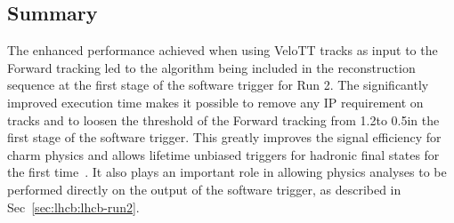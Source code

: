 \subsection{Summary}
\label{sec:up-track-run2:summary}

The enhanced performance achieved when using VeloTT tracks as input to the Forward tracking led to the algorithm being included in the reconstruction sequence at the first stage of the software trigger for Run 2. The significantly improved execution time makes it possible to remove any IP requirement on \velo tracks and to loosen the \pt threshold of the Forward tracking from 1.2\gevc to 0.5\gevc in the first stage of the software trigger. This greatly improves the signal efficiency for charm physics and allows lifetime unbiased triggers for hadronic final states for the first time~\cite{hlt-run2}. It also plays an important role in allowing physics analyses to be performed directly on the output of the software trigger, as described in Sec~\ref{sec:lhcb:lhcb-run2}.